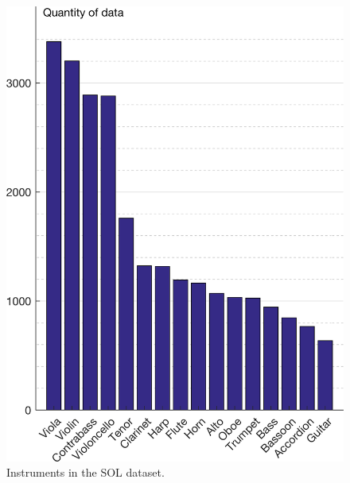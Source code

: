 \documentclass{article}
\begin{document}

\begin{figure}[t!]
\centering
\includegraphics[width=\linewidth]{./figs/histogram/histogram_instruments.png}
\caption{Instruments in the SOL dataset.}
\label{fig:instrument-dendrogram}
\end{figure}
\end{document}
